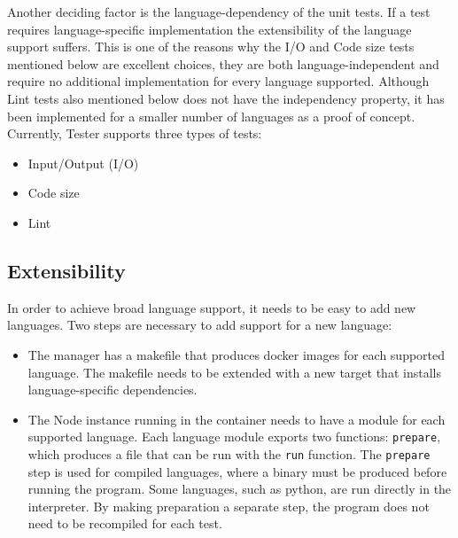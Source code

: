 Another deciding factor is the language-dependency of the unit tests. If a test requires language-specific implementation the extensibility of the language support suffers. This is one of the reasons why the I/O and Code size tests mentioned below are excellent choices, they are both language-independent and require no additional implementation for every language supported. Although Lint tests also mentioned below does not have the independency property, it has been implemented for a smaller number of languages as a proof of concept.
Currently, Tester supports three types of tests:
\begin{itemize}
\item Input/Output (I/O)
\item Code size
\item Lint
\end{itemize}


\subsection{Extensibility}
In order to achieve broad language support, it needs to be easy to add new languages. Two steps are necessary to add support for a new language:

\begin{itemize}
\item The manager has a makefile that produces docker images for each supported language. The makefile needs to be extended with a new target that installs language-specific dependencies.

\item The Node instance running in the container needs to have a module for each supported language. Each language module exports two functions: \texttt{prepare}, which produces a file that can be run with the \texttt{run} function. The \texttt{prepare} step is used for compiled languages, where a binary must be produced before running the program. Some languages, such as python, are run directly in the interpreter. By making preparation a separate step, the program does not need to be recompiled for each test.
\end{itemize}

